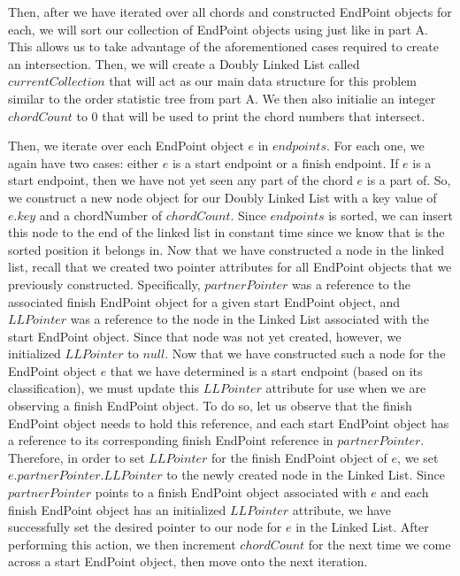 \documentclass[11pt]{article}
\begin{document}
Then, after we have iterated over all chords and constructed EndPoint objects for each, we will sort our collection of EndPoint objects using  just like in part A. This allows us to take advantage of the aforementioned cases required to create an intersection. Then, we will create a Doubly Linked List called $currentCollection$ that will act as our main data structure for this problem similar to the order statistic tree from part A. We then also initialie an integer $chordCount$ to 0 that will be used to print the chord numbers that intersect.

Then, we iterate over each EndPoint object $e$ in $endpoints$. For each one, we again have two cases: either $e$ is a start endpoint or a finish endpoint. If $e$ is a start endpoint, then we have not yet seen any part of the chord $e$ is a part of. So, we construct a new node object for our Doubly Linked List with a key value of $e.key$ and a chordNumber of $chordCount$. Since $endpoints$ is sorted, we can insert this node to the end of the linked list in constant time since we know that is the sorted position it belongs in. Now that we have constructed a node in the linked list, recall that we created two pointer attributes for all EndPoint objects that we previously constructed. Specifically, $partnerPointer$ was a reference to the associated finish EndPoint object for a given start EndPoint object, and $LLPointer$ was a reference to the node in the Linked List associated with the start EndPoint object. Since that node was not yet created, however, we initialized $LLPointer$ to $null$. Now that we have constructed such a node for the EndPoint object $e$ that we have determined is a start endpoint (based on its classification), we must update this $LLPointer$ attribute for use when we are observing a finish EndPoint object. To do so, let us observe that the finish EndPoint object needs to hold this reference, and each start EndPoint object has a reference to its corresponding finish EndPoint reference in $partnerPointer$. Therefore, in order to set $LLPointer$ for the finish EndPoint object of $e$, we set $e.partnerPointer.LLPointer$ to the newly created node in the Linked List. Since $partnerPointer$ points to a finish EndPoint object associated with $e$ and each finish EndPoint object has an initialized $LLPointer$ attribute, we have successfully set the desired pointer to our node for $e$ in the Linked List. After performing this action, we then increment $chordCount$ for the next time we come across a start EndPoint object, then move onto the next iteration.
\end{document}
